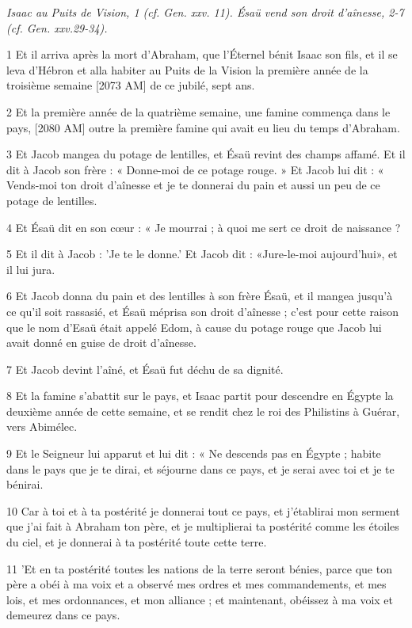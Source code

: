 
\par \textit{Isaac au Puits de Vision, 1 (cf. Gen. xxv. 11). Ésaü vend son droit d'aînesse, 2-7 (cf. Gen. xxv.29-34).}

\par 1 Et il arriva après la mort d'Abraham, que l'Éternel bénit Isaac son fils, et il se leva d'Hébron et alla habiter au Puits de la Vision la première année de la troisième semaine [2073 AM] de ce jubilé, sept ans.
\par 2 Et la première année de la quatrième semaine, une famine commença dans le pays, [2080 AM] outre la première famine qui avait eu lieu du temps d'Abraham.
\par 3 Et Jacob mangea du potage de lentilles, et Ésaü revint des champs affamé. Et il dit à Jacob son frère : « Donne-moi de ce potage rouge. » Et Jacob lui dit : « Vends-moi ton droit d'aînesse et je te donnerai du pain et aussi un peu de ce potage de lentilles.
\par 4 Et Ésaü dit en son cœur : « Je mourrai ; à quoi me sert ce droit de naissance ?
\par 5 Et il dit à Jacob : 'Je te le donne.' Et Jacob dit : «Jure-le-moi aujourd'hui», et il lui jura.
\par 6 Et Jacob donna du pain et des lentilles à son frère Ésaü, et il mangea jusqu'à ce qu'il soit rassasié, et Ésaü méprisa son droit d'aînesse ; c'est pour cette raison que le nom d'Esaü était appelé Edom, à cause du potage rouge que Jacob lui avait donné en guise de droit d'aînesse.
\par 7 Et Jacob devint l'aîné, et Ésaü fut déchu de sa dignité.
\par 8 Et la famine s'abattit sur le pays, et Isaac partit pour descendre en Égypte la deuxième année de cette semaine, et se rendit chez le roi des Philistins à Guérar, vers Abimélec.
\par 9 Et le Seigneur lui apparut et lui dit : « Ne descends pas en Égypte ; habite dans le pays que je te dirai, et séjourne dans ce pays, et je serai avec toi et je te bénirai.
\par 10 Car à toi et à ta postérité je donnerai tout ce pays, et j'établirai mon serment que j'ai fait à Abraham ton père, et je multiplierai ta postérité comme les étoiles du ciel, et je donnerai à ta postérité toute cette terre.
\par 11 'Et en ta postérité toutes les nations de la terre seront bénies, parce que ton père a obéi à ma voix et a observé mes ordres et mes commandements, et mes lois, et mes ordonnances, et mon alliance ; et maintenant, obéissez à ma voix et demeurez dans ce pays.
